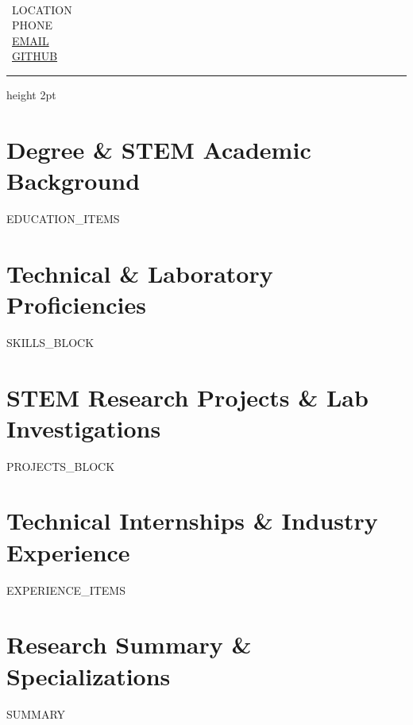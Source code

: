 \documentclass[10pt,letterpaper]{article}
\begin{document}
\begin{minipage}[t]{0.65\textwidth}
  {\Huge \textbf{}} \\[3pt]
  {\normalsize \textbf{}}
\end{minipage}
\hfill
\begin{minipage}[t]{0.33\textwidth}
  \raggedleft \small
  \faMapMarker* \ {{LOCATION}} \\
  \faPhone \ {{PHONE}} \\
  \faEnvelope \ \href{mailto:{{EMAIL}}}{{{EMAIL}}} \\
  \faGithub \ \href{https://{{GITHUB}}}{{{GITHUB}}}
\end{minipage}

\vspace{6pt}
{\color{stemviolet}\hrule height 2pt}
\vspace{6pt}

\section{Degree \& STEM Academic Background}
\small
{{EDUCATION_ITEMS}}

\section{Technical \& Laboratory Proficiencies}
\small
{{SKILLS_BLOCK}}

\section{STEM Research Projects \& Lab Investigations}
\small
{{PROJECTS_BLOCK}}

\section{Technical Internships \& Industry Experience}
\small
{{EXPERIENCE_ITEMS}}

\section{Research Summary \& Specializations}
\small
{{SUMMARY}}
\end{document}
